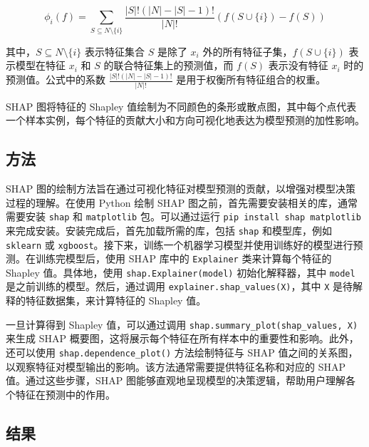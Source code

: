\documentclass[AutoFakeBold]{LZUThesis-PgD&PhD}
\begin{document}
\[
\phi_i(f) = \sum_{S \subseteq N \setminus \{i\}} \frac{|S|! (|N| - |S| - 1)!}{|N|!} \left( f(S \cup \{i\}) - f(S) \right)
\]

其中，\( S \subseteq N \setminus \{i\} \) 表示特征集合 \( S \) 是除了 \( x_i \) 外的所有特征子集，\( f(S \cup \{i\}) \) 表示模型在特征 \( x_i \) 和 \( S \) 的联合特征集上的预测值，而 \( f(S) \) 表示没有特征 \( x_i \) 时的预测值。公式中的系数 \( \frac{|S|! (|N| - |S| - 1)!}{|N|!} \) 是用于权衡所有特征组合的权重。

SHAP 图将特征的 Shapley 值绘制为不同颜色的条形或散点图，其中每个点代表一个样本实例，每个特征的贡献大小和方向可视化地表达为模型预测的加性影响。
\subsection{方法}
SHAP 图的绘制方法旨在通过可视化特征对模型预测的贡献，以增强对模型决策过程的理解。在使用 Python 绘制 SHAP 图之前，首先需要安装相关的库，通常需要安装 \texttt{shap} 和 \texttt{matplotlib} 包。可以通过运行 \texttt{pip install shap matplotlib} 来完成安装。安装完成后，首先加载所需的库，包括 \texttt{shap} 和模型库，例如 \texttt{sklearn} 或 \texttt{xgboost}。接下来，训练一个机器学习模型并使用训练好的模型进行预测。在训练完模型后，使用 SHAP 库中的 \texttt{Explainer} 类来计算每个特征的 Shapley 值。具体地，使用 \texttt{shap.Explainer(model)} 初始化解释器，其中 \texttt{model} 是之前训练的模型。然后，通过调用 \texttt{explainer.shap\_values(X)}，其中 \texttt{X} 是待解释的特征数据集，来计算特征的 Shapley 值。

一旦计算得到 Shapley 值，可以通过调用 \texttt{shap.summary\_plot(shap\_values, X)} 来生成 SHAP 概要图，这将展示每个特征在所有样本中的重要性和影响。此外，还可以使用 \texttt{shap.dependence\_plot()} 方法绘制特征与 SHAP 值之间的关系图，以观察特征对模型输出的影响。该方法通常需要提供特征名称和对应的 SHAP 值。通过这些步骤，SHAP 图能够直观地呈现模型的决策逻辑，帮助用户理解各个特征在预测中的作用。
\subsection{结果}
\end{document}
